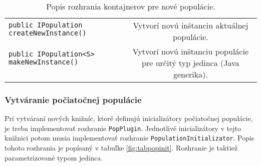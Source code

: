 \begin{table}
\begin{tabular}{|l|c|}
& \\
\hline
\verb|public IPopulation createNewInstance()| & \multirow{2}{5cm}{Vytvorí novú inštanciu aktuálnej populácie.} \\
& \\
\hline
\verb|public IPopulation<S> makeNewInstance()| & \multirow{3}{5cm}{Vytvorí novú inštanciu populácie pre určitý typ jedinca (Java generika).} \\
& \\
& \\
\hline
\end{tabular}
\caption{Popis rozhrania kontajnerov pre nové populácie.}\label{fig:tabpop}
\end{table}

\subsubsection*{Vytváranie počiatočnej populácie}
Pri vytváraní nových knižníc, ktoré definujú inicializátory počiatočnej populácie, je treba implementovať rozhranie \verb|PopPlugin|. Jednotlivé inicializátory v tejto knižnici potom musia implementovať rozhranie \verb|PopulationInitializator|. Popis tohoto rozhrania je popísaný v tabuľke \ref{fig:tabpopinit}. Rozhranie je taktiež parametrizované typom jedinca.

